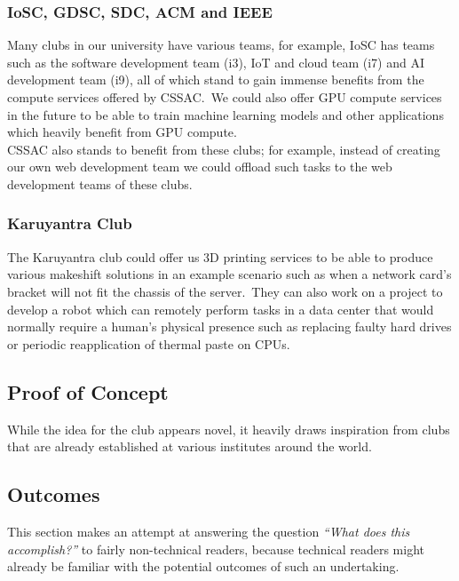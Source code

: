 \documentclass[11pt,twocolumn,oneside]{book}
\begin{document}
    \subsubsection{IoSC, GDSC, SDC, ACM and IEEE}
    Many clubs in our university have various teams, for example, IoSC has teams such as the software development team
    (i3), IoT and cloud team (i7) and AI development team (i9), all of which stand to gain immense benefits from the
    compute services offered by CSSAC.\ We could also offer GPU compute services in the future to be able to train
    machine learning models and other applications which heavily benefit from GPU compute.
    \\
    CSSAC also stands to benefit from these clubs; for example, instead of creating our own web development team we
    could offload such tasks to the web development teams of these clubs\@.

    \subsubsection{Karuyantra Club}
    The Karuyantra club could offer us 3D printing services to be able to produce various makeshift solutions in an
    example scenario such as when a network card's bracket will not fit the chassis of the server.\ They can also
    work on a project to develop a robot which can remotely perform tasks in a data center that would normally require a
    human's physical presence such as replacing faulty hard drives or periodic reapplication of thermal paste on CPUs.

    \subsection{Proof of Concept}\label{subsec:proof-of-concept}

    While the idea for the club appears novel, it heavily draws inspiration from clubs that are already established at
    various institutes around the world.


    \subsection{Outcomes}\label{subsec:outcomes}
    This section makes an attempt at answering the question \emph{``What does this accomplish?''} to fairly non-technical
    readers, because technical readers might already be familiar with the potential outcomes of such an undertaking.
\end{document}
